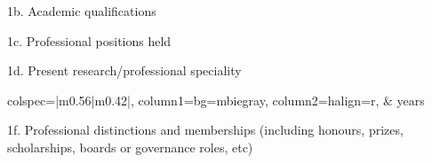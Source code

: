 \documentclass[a4paper,12pt]{article}
\begin{document}
    \begin{center}
    \end{center}
    \noindent{}
    

    \begin{breakawaybox}{1b. Academic qualifications}
        
    \end{breakawaybox}

    \begin{breakawaybox}{1c. Professional positions held}
        
    \end{breakawaybox}

    \begin{breakawaybox}{1d. Present research/professional speciality}
        
    \end{breakawaybox}

    \begin{table}[H]
        \begin{tblr}{
            colspec={|m{0.56\textwidth}|m{0.42\textwidth}|},
            column{1}={bg=mbiegray},
            column{2}={halign=r},
        }
            \hline
             &  years \\
            \hline
        \end{tblr}
    \end{table}

    \begin{breakawaybox}{{1f. Professional distinctions and memberships (including honours, prizes, scholarships, boards or governance roles, etc)}}
        
    \end{breakawaybox}

    

    \noindent{}

    \nocite{*}
\end{document}
